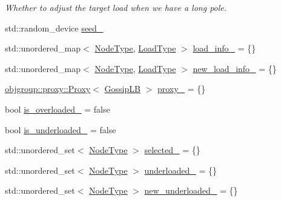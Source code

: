 \begin{DoxyCompactItemize}
\begin{DoxyCompactList}\small\item\em Whether to adjust the target load when we have a long pole. \end{DoxyCompactList}\item 
std\+::random\+\_\+device \hyperlink{structvt_1_1vrt_1_1collection_1_1lb_1_1_gossip_l_b_abd01127dcc3adcb07a8ff16465068443}{seed\+\_\+}
\item 
std\+::unordered\+\_\+map$<$ \hyperlink{namespacevt_a866da9d0efc19c0a1ce79e9e492f47e2}{Node\+Type}, \hyperlink{structvt_1_1vrt_1_1collection_1_1lb_1_1_base_l_b_a215e22b9f12678303f49615ae3be05cc}{Load\+Type} $>$ \hyperlink{structvt_1_1vrt_1_1collection_1_1lb_1_1_gossip_l_b_abfa1681074e4b0388be84f87b7cd7f25}{load\+\_\+info\+\_\+} = \{\}
\item 
std\+::unordered\+\_\+map$<$ \hyperlink{namespacevt_a866da9d0efc19c0a1ce79e9e492f47e2}{Node\+Type}, \hyperlink{structvt_1_1vrt_1_1collection_1_1lb_1_1_base_l_b_a215e22b9f12678303f49615ae3be05cc}{Load\+Type} $>$ \hyperlink{structvt_1_1vrt_1_1collection_1_1lb_1_1_gossip_l_b_af6404f9dab74e3afd64c6faeeb263946}{new\+\_\+load\+\_\+info\+\_\+} = \{\}
\item 
\hyperlink{structvt_1_1objgroup_1_1proxy_1_1_proxy}{objgroup\+::proxy\+::\+Proxy}$<$ \hyperlink{structvt_1_1vrt_1_1collection_1_1lb_1_1_gossip_l_b}{Gossip\+LB} $>$ \hyperlink{structvt_1_1vrt_1_1collection_1_1lb_1_1_gossip_l_b_a334ddc77cb6dc72408d0ee089869ffe1}{proxy\+\_\+} = \{\}
\item 
bool \hyperlink{structvt_1_1vrt_1_1collection_1_1lb_1_1_gossip_l_b_a432ef6985a152c97c60184a3ccbda082}{is\+\_\+overloaded\+\_\+} = false
\item 
bool \hyperlink{structvt_1_1vrt_1_1collection_1_1lb_1_1_gossip_l_b_a8cbe2b210b71f7261240325ebbf81cd7}{is\+\_\+underloaded\+\_\+} = false
\item 
std\+::unordered\+\_\+set$<$ \hyperlink{namespacevt_a866da9d0efc19c0a1ce79e9e492f47e2}{Node\+Type} $>$ \hyperlink{structvt_1_1vrt_1_1collection_1_1lb_1_1_gossip_l_b_a11e92bfca8ee25075fc14af35cd4a5ff}{selected\+\_\+} = \{\}
\item 
std\+::unordered\+\_\+set$<$ \hyperlink{namespacevt_a866da9d0efc19c0a1ce79e9e492f47e2}{Node\+Type} $>$ \hyperlink{structvt_1_1vrt_1_1collection_1_1lb_1_1_gossip_l_b_a446275a50d83148d702b293bdae89da4}{underloaded\+\_\+} = \{\}
\item 
std\+::unordered\+\_\+set$<$ \hyperlink{namespacevt_a866da9d0efc19c0a1ce79e9e492f47e2}{Node\+Type} $>$ \hyperlink{structvt_1_1vrt_1_1collection_1_1lb_1_1_gossip_l_b_a6a4bbf37081ffc5a0d8933f02a6bf3fa}{new\+\_\+underloaded\+\_\+} = \{\}

\end{DoxyCompactItemize}
